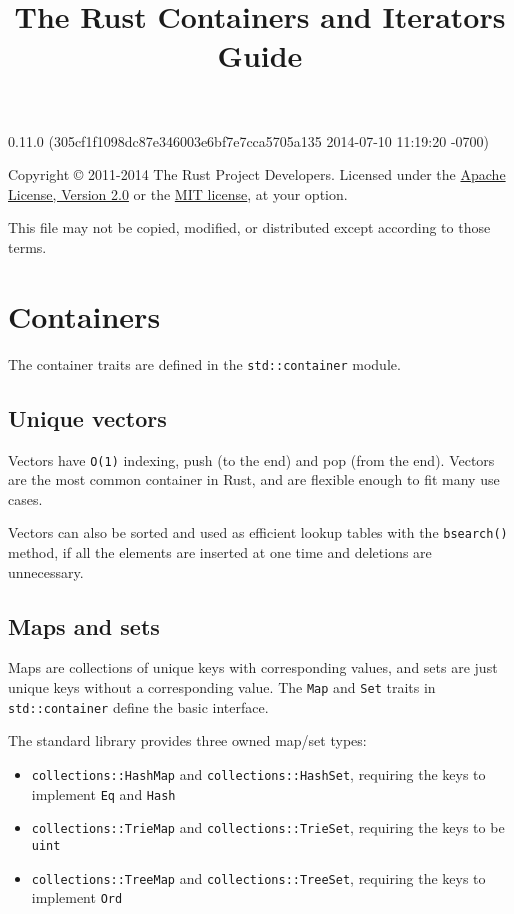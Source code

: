 \documentclass[]{article}
\title{The Rust Containers and Iterators Guide}
\begin{document}
\maketitle

0.11.0 (305cf1f1098dc87e346003e6bf7e7cca5705a135 2014-07-10 11:19:20 -0700)

Copyright © 2011-2014 The Rust Project Developers. Licensed under the
\href{http://www.apache.org/licenses/LICENSE-2.0}{Apache License,
Version 2.0} or the \href{http://opensource.org/licenses/MIT}{MIT
license}, at your option.

This file may not be copied, modified, or distributed except according
to those terms.

{
\hypersetup{linkcolor=black}
\setcounter{tocdepth}{3}
\tableofcontents
}
\section{Containers}\label{containers}

The container traits are defined in the \texttt{std::container} module.

\subsection{Unique vectors}\label{unique-vectors}

Vectors have \texttt{O(1)} indexing, push (to the end) and pop (from the
end). Vectors are the most common container in Rust, and are flexible
enough to fit many use cases.

Vectors can also be sorted and used as efficient lookup tables with the
\texttt{bsearch()} method, if all the elements are inserted at one time
and deletions are unnecessary.

\subsection{Maps and sets}\label{maps-and-sets}

Maps are collections of unique keys with corresponding values, and sets
are just unique keys without a corresponding value. The \texttt{Map} and
\texttt{Set} traits in \texttt{std::container} define the basic
interface.

The standard library provides three owned map/set types:

\begin{itemize}
\itemsep1pt\parskip0pt
\item
  \texttt{collections::HashMap} and \texttt{collections::HashSet},
  requiring the keys to implement \texttt{Eq} and \texttt{Hash}
\item
  \texttt{collections::TrieMap} and \texttt{collections::TrieSet},
  requiring the keys to be \texttt{uint}
\item
  \texttt{collections::TreeMap} and \texttt{collections::TreeSet},
  requiring the keys to implement \texttt{Ord}
\end{itemize}
\end{document}
